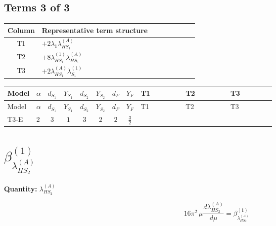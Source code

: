 \documentclass[8pt]{article}
\begin{document}
\begin{landscape}
\subsection*{Terms 3 of 3}
\begin{center}
\begin{tabular}{@{}c >{\raggedright\arraybackslash}p{0.82\linewidth}@{}}
\toprule
Column & Representative term structure \\
\midrule
T1 & \(\displaystyle +2 {\lambda_1} {\lambda_{HS_1}^{(A)}}\) \\
\midrule
T2 & \(\displaystyle +8 {\lambda_{HS_1}^{(1)}} {\lambda_{HS_1}^{(A)}}\) \\
\midrule
T3 & \(\displaystyle +2 {\lambda_{HS_1}^{(A)}} {\lambda_{S_1}^{(1)}}\) \\
\midrule
\bottomrule
\end{tabular}
\end{center}
\smallskip
\tiny
\begin{longtable}{@{}llcccccc >{\raggedright\arraybackslash}p{0.21\linewidth} >{\raggedright\arraybackslash}p{0.21\linewidth} >{\raggedright\arraybackslash}p{0.21\linewidth}@{}}
\toprule
Model & $\alpha$ & $d_{S_1}$ & $Y_{S_1}$ & $d_{S_2}$ & $Y_{S_2}$ & $d_F$ & $Y_F$ & T1 & T2 & T3 \\
\midrule
\endfirsthead
\toprule
Model & $\alpha$ & $d_{S_1}$ & $Y_{S_1}$ & $d_{S_2}$ & $Y_{S_2}$ & $d_F$ & $Y_F$ & T1 & T2 & T3 \\
\midrule
\endhead
T3-E & $2$ & $3$ & $1$ & $3$ & $2$ & $2$ & $\frac{3}{2}$ & \scriptsize\adjustbox{max width=\linewidth}{$\begin{gathered} +2 {\lambda_1} {\lambda_{HS_1}^{(A)}}\end{gathered}$} & \scriptsize\adjustbox{max width=\linewidth}{$\begin{gathered} +8 {\lambda_{HS_1}^{(1)}} {\lambda_{HS_1}^{(A)}}\end{gathered}$} & \scriptsize\adjustbox{max width=\linewidth}{$\begin{gathered} +2 {\lambda_{HS_1}^{(A)}} {\lambda_{S_1}^{(1)}}\end{gathered}$} \\
\midrule
\bottomrule
\end{longtable}
\clearpage
\section*{$\beta_{\lambda_{HS_2}^{(A)}}^{(1)}$}
\noindent\textbf{Quantity: }$\lambda_{HS_2}^{(A)}$\par\smallskip
\[16\pi^2\,\mu\frac{d \lambda_{HS_2}^{(A)}}{d\mu}=\beta_{\lambda_{HS_2}^{(A)}}^{(1)}\]

\end{landscape}
\end{document}
